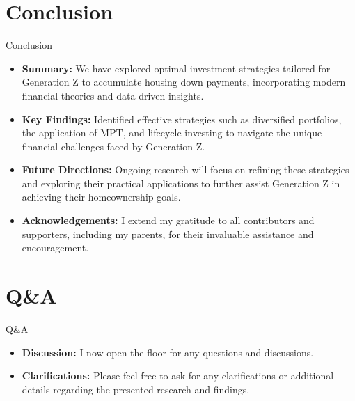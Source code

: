 \documentclass{beamer}
\begin{document}
\section{Conclusion}
\begin{frame}{Conclusion}
    \begin{itemize}
        \item \textbf{Summary:} We have explored optimal investment strategies tailored for Generation Z to accumulate housing down payments, incorporating modern financial theories and data-driven insights.
        \item \textbf{Key Findings:} Identified effective strategies such as diversified portfolios, the application of MPT, and lifecycle investing to navigate the unique financial challenges faced by Generation Z.
        \item \textbf{Future Directions:} Ongoing research will focus on refining these strategies and exploring their practical applications to further assist Generation Z in achieving their homeownership goals.
        \item \textbf{Acknowledgements:} I extend my gratitude to all contributors and supporters, including my parents, for their invaluable assistance and encouragement.
    \end{itemize}
\end{frame}

\section{Q\&A}
\begin{frame}{Q\&A}
    \begin{itemize}
        \item \textbf{Discussion:} I now open the floor for any questions and discussions.
        \item \textbf{Clarifications:} Please feel free to ask for any clarifications or additional details regarding the presented research and findings.
    \end{itemize}
\end{frame}
\end{document}
